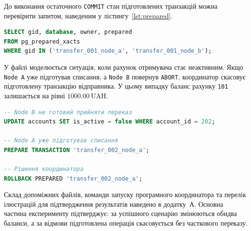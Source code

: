 До виконання остаточного \texttt{COMMIT} стан підготовлених транзакцій можна перевірити запитом, наведеним у лістингу~\ref{lst:prepared}.

\begin{lstlisting}[language=SQL,caption={Перегляд підготовлених транзакцій},label={lst:prepared}]
SELECT gid, database, owner, prepared
FROM pg_prepared_xacts
WHERE gid IN ('transfer_001_node_a', 'transfer_001_node_b');
\end{lstlisting}

У файлі  моделюється ситуація, коли рахунок отримувача стає неактивним. Якщо \texttt{Node A} уже підготував списання, а \texttt{Node B} повернув \texttt{ABORT}, координатор скасовує підготовлену транзакцію відправника. У цьому випадку баланс рахунку \texttt{101} залишається на рівні \(1000.00~\mathrm{UAH}\).

\begin{lstlisting}[language=SQL,caption={Сценарій відкату підготовленої транзакції},label={lst:abort}]
-- Node B не готовий прийняти переказ
UPDATE accounts SET is_active = false WHERE account_id = 202;

-- Node A уже підготував списання
PREPARE TRANSACTION 'transfer_002_node_a';

-- Рішення координатора
ROLLBACK PREPARED 'transfer_002_node_a';
\end{lstlisting}

Склад допоміжних файлів, команди запуску програмного координатора та перелік ілюстрацій для підтвердження результатів наведено в додатку~А. Основна частина експерименту підтверджує: за успішного сценарію змінюються обидва баланси, а за відмови підготовлена операція скасовується без часткового переказу.


